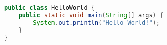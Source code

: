 \label{ap:C}




\begin{lstlisting}[language=Java,caption={Hello World em Java}]
public class HelloWorld {
	public static void main(String[] args) {
		System.out.println("Hello World!");
	}
}
\end{lstlisting}


